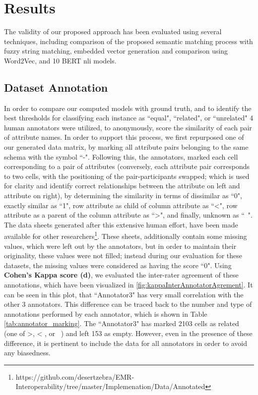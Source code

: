 
\section*{Results}
\label{results}

The validity of our proposed approach has been evaluated using several techniques, including comparison of the proposed semantic matching process with fuzzy string matching, embedded vector generation and comparison using Word2Vec, and 10 BERT nli models. 

\subsection*{Dataset Annotation}
In order to compare our computed models with ground truth, and to identify the best thresholds for classifying each instance as ``equal", ``related", or ``unrelated" 4 human annotators were utilized, to anonymously, score the similarity of each pair of attribute names. In order to support this process, we first repurposed one of our generated data matrix, by marking all attribute pairs belonging to the same schema with the symbol ``-". Following this, the annotators, marked each cell corresponding to a pair of attributes (conversely, each attribute pair corresponds to two cells, with the positioning of the pair-participants swapped; which is used for clarity and identify correct relationships between the attribute on left and attribute on right), by determining the similarity in terms of dissimilar as ``0", exactly similar as ``1", row attribute as child of column attribute as ``<", row attribute as a parent of the column attribute as ``>", and finally, unknown as ``~". The data sheets generated after this extensive human effort, have been made available for other researchers\footnote{https://github.com/desertzebra/EMR-Interoperability/tree/master/Implemenation/Data/Annotated}.
These sheets, additionally contain some missing values, which were left out by the annotators, but in order to maintain their originality, these values were not filled; instead during our evaluation for these datasets, the missing values were considered as having the score ``0". Using \textbf{Cohen's Kappa score (d)}, we evaluated the inter-rater agreement of these annotations, which have been visualized in \ref{fig:kappaInterAnnotatorAgrement}. It can be seen in this plot, that ``Annotator3" has very small correlation with the other 3 annotators. This difference can be traced back to the number and type of annotations performed by each annotator, which is shown in Table \ref{tab:annotator_marking}. The ``Annotator3" has marked 2103 cells as related (one of >, < , or ~) and left 153 as empty. However, even in the presence of these difference, it is pertinent to include the data for all annotators in order to avoid any biasedness. 
